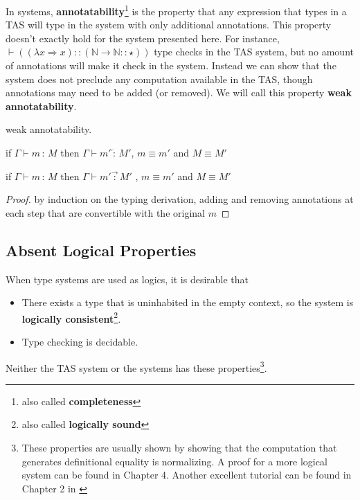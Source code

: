 In \Bidir{} systems, \textbf{annotatability}\footnote{also called \textbf{completeness}} is the property that any expression that types in a \ac{TAS} will type in the \bidir{} system with only additional annotations.
This property doesn't exactly hold for the \bidir{} system presented here.
For instance, $\vdash\left((\lambda x\Rightarrow x)::\left(\mathbb{N}\rightarrow\mathbb{N}::\star\right)\right)$ type checks in the \ac{TAS} system, but no amount of annotations will make it check in the \bidir{} system.
Instead we can show that the \bidir{} system does not preclude any computation available in the \ac{TAS}, though annotations may need to be added (or removed).%
We will call this property \textbf{weak annotatability}.
\begin{thm}
weak annotatability.

if $\Gamma\vdash m\,:\,M$ then $\Gamma\vdash m'\overleftarrow{\,:\,}M'$, $m\equiv m'$ and $M\equiv M'$ 

if $\Gamma\vdash m\,:\,M$ then $\Gamma\vdash m'\overrightarrow{\,:\,}M'$ , $m\equiv m'$ and $M\equiv M'$
\end{thm}

\begin{proof}
by induction on the typing derivation, adding and removing annotations at each step that are convertible with the original $m$
\end{proof}

\subsection{Absent Logical Properties}

When type systems are used as logics, it is desirable that
\begin{itemize}
\item There exists a type that is uninhabited in the empty context, so the system is \textbf{logically consistent}\footnote{also called \textbf{logically sound}}.
\item Type checking is decidable.
\end{itemize}
Neither the \ac{TAS} system or the \Bidir{} systems has these properties\footnote{These properties are usually shown by showing that the computation that generates definitional equality is normalizing.
A proof for a more logical system can be found in Chapter 4\cite{luo1994computation}.
Another excellent tutorial can be found in Chapter 2 in \cite{casinghino2014combiningthesis}}.

